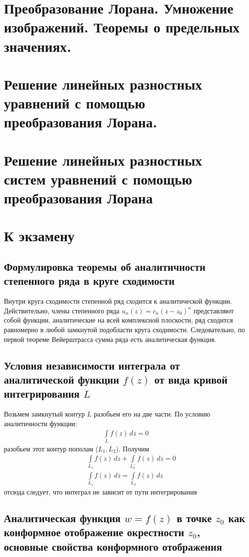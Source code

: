 \documentclass[12pt]{extarticle}
\renewcommand{\d}{\,d}
\begin{document}
\section{Преобразование Лорана. Умножение изображений. Теоремы о
предельных значениях.}
\section{Решение линейных разностных уравнений с помощью преобразования
Лорана.}
\section{Решение линейных разностных систем уравнений с помощью
преобразования Лорана}

\section{К экзамену}
\subsection{Формулировка теоремы об аналитичности степенного ряда в
круге сходимости}
Внутри круга сходимости степенной ряд сходится к аналитической функции.
Действительно, члены степенного ряда $u_{n}(z)=c_{n}(z-z_{0})^{n}$
представляют собой функции, аналитические на всей комплексной плоскости,
ряд сходится равномерно в любой замкнутой подобласти круга сходимости.
Следовательно, по первой теореме Вейерштрасса сумма ряда есть
аналитическая функция.
\subsection{Условия независимости интеграла от аналитической функции
$f(z)$ от вида кривой интегрирования $L$}
Возьмем замкнутый контур $L$ разобьем его на две части. По условию
аналитичности функции:
\begin{eqnarray*}
    \int\limits_{L}f(z)\d{z}=0
\end{eqnarray*}
разобьем этот контур пополам ($L_{1},L_{2}$). Получим
\begin{eqnarray*}
    &&\int\limits_{L_{1}}f(z)\d{z}+\int\limits_{L_{2}^{-}}f(z)\d{z}=0\\
    &&\int\limits_{L_{1}}f(z)\d{z}=\int\limits_{L_{2}}f(z)\d{z}
\end{eqnarray*}
отсюда следует, что интеграл не зависит от пути интегрирования

\subsection{Аналитическая функция $w=f(z)$ в точке $z_{0}$ как
конформное отображение окрестности $z_{0}$, основные свойства
конформного отображения}
\end{document}
